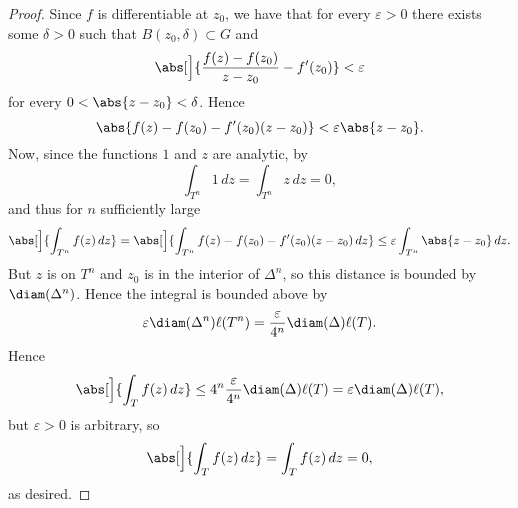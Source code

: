 \begin{proof}
	Since $f$ is differentiable at $z_0$, we have that for every $\varepsilon > 0$ there exists some $\delta > 0$ such that $B(z_0, \delta) \subset G$ and
	\[
		\abs[\Big]{\frac{f(z) - f(z_0)}{z - z_0} - f'(z_0)} < \varepsilon
	\]
	for every $0 < \abs{z - z_0} < \delta$.
	Hence
	\[
		\abs{f(z) - f(z_0) - f'(z_0) (z - z_0)} < \varepsilon \abs{z - z_0}.
	\]
	Now, since the functions $1$ and $z$ are analytic, by 
	\[
		\int_{T^n} 1 \, d z = \int_{T^n} z \, d z = 0,
	\]
	and thus for $n$ sufficiently large
	\[
		\abs[\Big]{\int_{T^n} f(z) \, d z} = \abs[\Big]{\int_{T^n} f(z) - f(z_0) - f'(z_0) (z - z_0) \, d z} \leq \varepsilon \int_{T^n} \abs{z - z_0} \, d z.
	\]
	But $z$ is on $T^n$ and $z_0$ is in the interior of $\Delta^n$, so this distance is bounded by $\diam(\Delta^n)$.
	Hence the integral is bounded above by
	\[
		\varepsilon \diam(\Delta^n) \ell(T^n) = \frac{\varepsilon}{4^n} \diam(\Delta) \ell(T).
	\]
	Hence
	\[
		\abs[\Big]{\int_T f(z) \, d z} \leq 4^n \frac{\varepsilon}{4^n} \diam(\Delta) \ell(T) = \varepsilon \diam(\Delta) \ell(T),
	\]
	but $\varepsilon > 0$ is arbitrary, so
	\[
		\abs[\Big]{\int_T f(z) \, d z} = \int_T f(z) \, d z = 0,
	\]
	as desired.
\end{proof}
